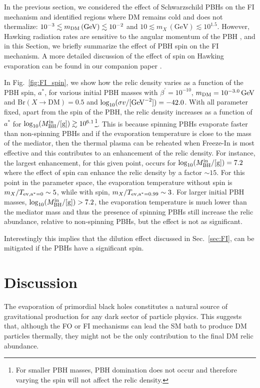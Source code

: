 \documentclass[aps,prd,reprint,twocolumn,preprintnumbers,floatfix,nofootinbib]{revtex4-1}
\newcommand{\mDM}{m_{\rm DM}}
\newcommand{\MBH}{M_{\rm BH}}
\newcommand{\figref}[1]{Fig.~\ref{#1}}
\newcommand{\secref}[1]{Sec.~\ref{#1}}
\begin{document}
 In the previous section, we considered the effect of Schwarzschild PBHs on the FI mechanism and identified regions where DM remains cold and does not thermalize: $10^{-3}\lesssim \mDM\,(\text{GeV}) \lesssim 10^{-2}$
 and $10\lesssim m_{X}\,(\text{GeV})\lesssim 10^{1.5}$.
 However, Hawking radiation rates are sensitive to the angular momentum of the PBH \cite{Page:1976ki}, and in this Section, we briefly summarize the effect of PBH spin on the FI mechanism.  A more detailed discussion of the effect of spin on Hawking evaporation can be found in our companion paper \cite{paper1}.
 
 In \figref{fig:FI_spin}, we show how the relic density varies as a function of the PBH spin, $a^*$, for various initial PBH masses with $\beta^\prime = 10^{-10}$, 
 $\mDM = 10^{-3.0}\, \rm{GeV}$  and $\mathrm{Br}(X\to \mathrm{DM}) = 0.5$ and $\log_{10}(\sigma v/[\rm{GeV}^{-2}]) = -42.0$. With all parameter fixed, apart from the spin of the PBH, the 
relic density increases as a function of $a^*$ for $\log_{10}(\MBH^{\rm in}/[\rm{g}])\gtrsim 10^{6.1}$\footnote{For smaller PBH masses, PBH domination does not occur and therefore varying the spin will not affect the relic density.}. This is because spinning PBHs evaporate faster than non-spinning PBHs and if the evaporation temperature is close to the mass of the mediator, then the thermal plasma can be reheated when Freeze-In is most effective and this contributes to an enhancement of the relic density. For instance, 
the largest enhancement, for this given point,  occurs for $\log_{10}(\MBH^{\rm in}/[\rm{g}])= 7.2$ where the effect of spin can enhance the relic density by a factor $\sim 15$. For this point in the parameter space, the evaporation temperature without spin is  $m_{X}/ T_{\rm ev, a^*=0} \sim 5$, while with spin,  $m_{X}/T_{\rm ev, a^*=0.99} \sim 3$. For larger initial PBH masses, $\log_{10}(\MBH^{\rm in}/[\rm{g}]) > 7.2$, the evaporation temperature is much lower than the mediator mass and thus the presence of spinning PBHs still increase the relic abundance, relative to non-spinning PBHs, but the effect is not as significant. 

Interestingly this implies that the dilution effect discussed in \secref{sec:FI}, can be mitigated if 
the PBHs have a significant spin. 



 
\section{Discussion}
The evaporation of primordial black holes constitutes a natural source of gravitational production for any dark sector of particle physics. This suggests that, although the FO or FI mechanisms can lead the SM bath to produce DM particles thermally, they might not be the only contribution to the final DM relic abundance.
\end{document}
